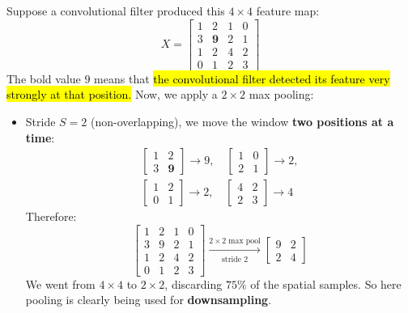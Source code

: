 \begin{examplebox}
    Suppose a convolutional filter produced this $4 \times 4$ feature map:
    \begin{equation*}
        X = \begin{bmatrix}
            1 & 2 & 1 & 0 \\
            3 & \mathbf{9} & 2 & 1 \\
            1 & 2 & 4 & 2 \\
            0 & 1 & 2 & 3
        \end{bmatrix}
    \end{equation*}
    The bold value $9$ means that \hl{the convolutional filter detected its feature very strongly at that position.} Now, we apply a $2 \times 2$ max pooling:
    \begin{itemize}
        \item Stride $S = 2$ (non-overlapping), we move the window \textbf{two positions at a time}:
        \begin{gather*}
            \begin{bmatrix}
                1 & 2 \\
                3 & \mathbf{9}
            \end{bmatrix} \to 9, \quad
            \begin{bmatrix}
                1 & 0 \\
                2 & 1
            \end{bmatrix} \to 2, \\
            \begin{bmatrix}
                1 & 2 \\
                0 & 1
            \end{bmatrix} \to 2, \quad
            \begin{bmatrix}
                4 & 2 \\
                2 & 3
            \end{bmatrix} \to 4
        \end{gather*}
        Therefore:
        \begin{equation*}
            \begin{bmatrix}
                1 & 2 & 1 & 0 \\
                3 & 9 & 2 & 1 \\
                1 & 2 & 4 & 2 \\
                0 & 1 & 2 & 3
            \end{bmatrix}
            \xrightarrow[\text{stride 2}]{2 \times 2 \text{ max pool}}
            \begin{bmatrix}
                9 & 2 \\
                2 & 4
            \end{bmatrix}
        \end{equation*}
        We went from $4 \times 4$ to $2 \times 2$, discarding $75\%$ of the spatial samples. So here pooling is clearly being used for \textbf{downsampling}.



\end{itemize}
\end{examplebox}
